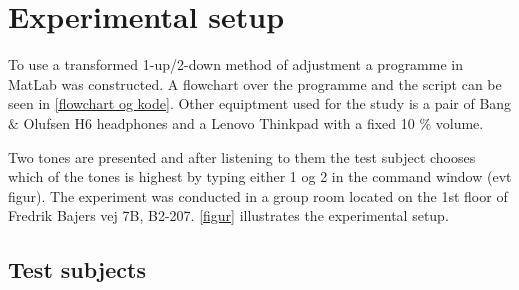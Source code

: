 \section*{Experimental setup}
To use a transformed 1-up/2-down method of adjustment a programme in MatLab was constructed. A flowchart over the programme and the script can be seen in \autoref{flowchart og kode}. Other equiptment used for the study is a pair of Bang $\&$ Olufsen H6 headphones and a Lenovo Thinkpad with a fixed 10 \% volume.

Two tones are presented and after listening to them the test subject chooses which of the tones is highest by typing either 1 og 2 in the command window (evt figur). The experiment was conducted in a group room located on the 1st floor of Fredrik Bajers vej 7B, B2-207. \autoref{figur} illustrates the experimental setup. 

\subsection*{Test subjects}